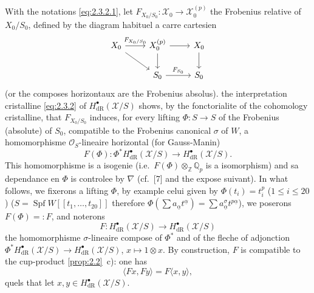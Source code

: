 \documentclass[12pt,a4paper]{article}
\theoremstyle{plain}
\theoremstyle{definition}
\theoremstyle{remark}
\DeclareMathOperator{\Spf}{Spf}
\begin{document}
\subsection{}

With the notations \eqref{eq:2.3.2.1}, let $F_{X_0/S_0}: \mathcal{X}_0 \to \mathcal{X}_0^{(p)}$ the Frobenius relative of $X_0/S_0$, defined by the diagram habituel a carre cartesien
\begin{equation}\label{eq:2.5.1}
\begin{tikzcd}
X_0 \arrow[r, "F_{X_0/S_0}"] \arrow[dr] & X_0^{(p)} \arrow[r] \arrow[d] & X_0 \arrow[d] \\
& S_0 \arrow[r, "F_{S_0}"] & S_0
\end{tikzcd}
\end{equation}
(or the composes horizontaux are the Frobenius absolus). the interpretation cristalline \eqref{eq:2.3.2} of $H^{\bullet}_{\mathrm{dR}}(\mathcal{X}/S)$ shows, by the fonctorialite of the cohomology cristalline, that $F_{X_0/S_0}$ induces, for every lifting $\Phi: S \to S$ of the Frobenius (absolute) of $S_0$, compatible to the Frobenius canonical $\sigma$ of $W$, a homomorphisme $\mathcal{O}_S$-lineaire horizontal (for Gauss-Manin)
\begin{equation}\label{eq:2.5.2}
F(\Phi): \Phi^* H^{\bullet}_{\mathrm{dR}}(\mathcal{X}/S) \to H^{\bullet}_{\mathrm{dR}}(\mathcal{X}/S).
\end{equation}
This homomorphisme is a isogenie (i.e.~$F(\Phi) \otimes_{\mathbb{Z}} \mathbb{Q}_p$ is a isomorphism) and sa dependance en $\Phi$ is controlee by $\nabla$ (cf.~[7] and the expose suivant). In what follows, we fixerons a lifting $\Phi$, by example celui given by $\Phi(t_i) = t_i^p$ ($1 \leqslant i \leqslant 20$) ($S = \Spf W[[t_1, \ldots, t_{20}]]$ therefore $\Phi(\sum a_{\underline{\alpha}} t^{\underline{\alpha}}) = \sum a^{\sigma}_{\underline{\alpha}} t^{p\underline{\alpha}}$), we poserons $F(\Phi) =: F$, and noterons
\begin{equation}\label{eq:2.5.3}
F: H^{\bullet}_{\mathrm{dR}}(\mathcal{X}/S) \to H^{\bullet}_{\mathrm{dR}}(\mathcal{X}/S)
\end{equation}
the homomorphisme $\sigma$-lineaire compose of $\Phi^*$ and of the fleche of adjonction $\Phi^* H^{\bullet}_{\mathrm{dR}}(\mathcal{X}/S) \to H^{\bullet}_{\mathrm{dR}}(\mathcal{X}/S)$, $x \mapsto 1 \otimes x$. By construction, $F$ is compatible to the cup-product \ref{prop:2.2}~c): one has
\begin{equation}\label{eq:2.5.4}
\langle Fx, Fy \rangle = F\langle x, y \rangle,
\end{equation}
quels that let $x, y \in H^{\bullet}_{\mathrm{dR}}(\mathcal{X}/S)$.
\end{document}
